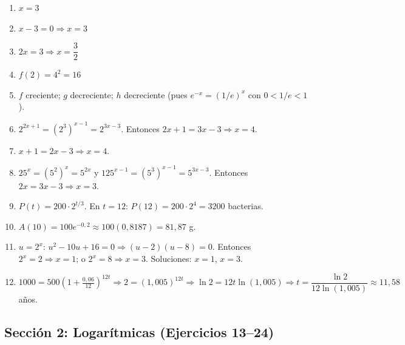 \documentclass[12pt, letterpaper]{article}
\begin{document}
\begin{enumerate}[series=respuestas, leftmargin=*, label=\textbf{\arabic*.}]
  \item $x = 3$
  \item $x - 3 = 0 \Rightarrow x = 3$
  \item $2x = 3 \Rightarrow x = \dfrac{3}{2}$
  \item $f(2) = 4^2 = 16$
  \item $f$ creciente; $g$ decreciente; $h$ decreciente (pues $e^{-x} = (1/e)^x$ con $0 < 1/e < 1$).
  \item $2^{2x+1} = (2^3)^{x-1} = 2^{3x-3}$. Entonces $2x+1 = 3x-3 \Rightarrow x = 4$.
  \item $x + 1 = 2x - 3 \Rightarrow x = 4$.
  \item $25^x = (5^2)^x = 5^{2x}$ y $125^{x-1} = (5^3)^{x-1} = 5^{3x-3}$. Entonces $2x = 3x - 3 \Rightarrow x = 3$.
  \item $P(t) = 200 \cdot 2^{t/3}$. En $t = 12$: $P(12) = 200 \cdot 2^4 = 3200$ bacterias.
  \item $A(10) = 100 e^{-0{,}2} \approx 100(0{,}8187) = 81{,}87$ g.
  \item $u = 2^x$: $u^2 - 10u + 16 = 0 \Rightarrow (u - 2)(u - 8) = 0$. Entonces $2^x = 2 \Rightarrow x = 1$; o $2^x = 8 \Rightarrow x = 3$. Soluciones: $x = 1$, $x = 3$.
  \item $1000 = 500\left(1 + \frac{0{,}06}{12}\right)^{12t} \Rightarrow 2 = (1{,}005)^{12t} \Rightarrow \ln 2 = 12t \ln(1{,}005) \Rightarrow t = \dfrac{\ln 2}{12\ln(1{,}005)} \approx 11{,}58$ años.
\end{enumerate}


\subsection*{Sección 2: Logarítmicas (Ejercicios 13--24)}
\end{document}
